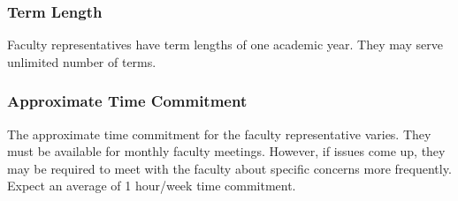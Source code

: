 \subsubsection{Term Length}
Faculty representatives have term lengths of one academic year. They may serve unlimited number of terms.

\subsubsection{Approximate Time Commitment}
The approximate time commitment for the faculty representative varies. They must be available for monthly faculty meetings. However, if issues come up, they may be required to meet with the faculty about specific concerns more frequently. Expect an average of 1 hour/week time commitment.